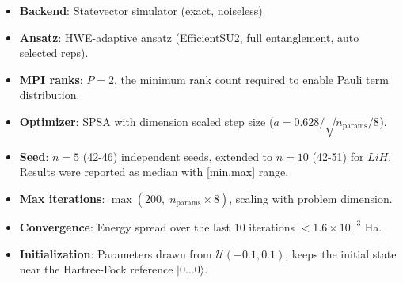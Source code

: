 \begin{itemize}
    \item \textbf{Backend}: Statevector simulator (exact, noiseless)  
    \item \textbf{Ansatz}: HWE-adaptive ansatz (EfficientSU2, full entanglement, auto selected reps). 
    \item \textbf{MPI ranks}: $P = 2$, the minimum rank count required to enable Pauli term distribution.
    \item \textbf{Optimizer}: SPSA with dimension scaled step size  ($a= 0.628 / \sqrt{n_{\text{params}} / 8}$). 
    \item \textbf{Seed}: $n=5$ (42-46) independent seeds, extended to $n=10$ (42-51) for $LiH$. Results were reported as median with [min,max] range. 
    \item \textbf{Max iterations}: $\max(200,\; n_{\text{params}} \times 8)$, scaling with problem dimension. 
    \item \textbf{Convergence}: Energy spread over the last 10 iterations $< 1.6 \times 10^{-3}$  Ha.         
    \item \textbf{Initialization}: Parameters drawn from $\mathcal{U}(-0.1, 0.1)$, keeps the initial state near the Hartree-Fock reference $|0\ldots0\rangle$. 
\end{itemize}   



